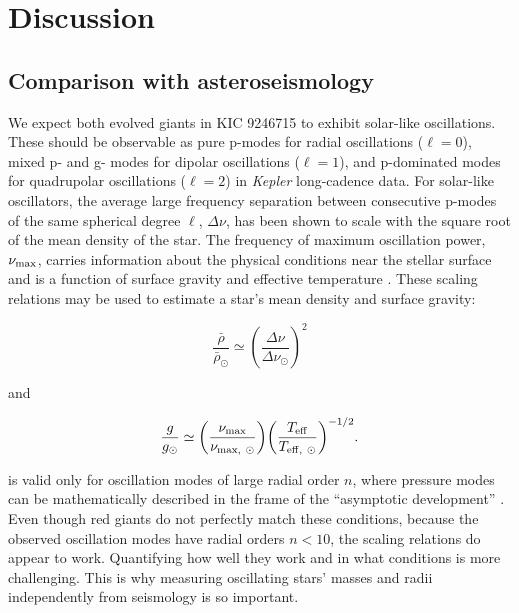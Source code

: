 \section{Discussion}\label{discuss}

\subsection{Comparison with asteroseismology}\label{seismo}
We expect both evolved giants in KIC 9246715 to exhibit solar-like oscillations. These should be observable as pure p-modes for radial oscillations ($\ell = 0$), mixed p- and g- modes for dipolar oscillations ($\ell = 1$), and p-dominated modes for quadrupolar oscillations ($\ell = 2$) in \emph{Kepler} long-cadence data. For solar-like oscillators, the average large frequency separation between consecutive p-modes of the same spherical degree $\ell$, $\Delta \nu$, has been shown to scale with the square root of the mean density of the star. The frequency of maximum oscillation power, $\nu_{\rm{max}}$, carries information about the physical conditions near the stellar surface and is a function of surface gravity and effective temperature \citep{kje95}. These scaling relations may be used to estimate a star's mean density and surface gravity:

\begin{equation} \label{density}
{\frac{\bar{\rho}}{\bar{\rho}_{\odot}}} \simeq {\left( \frac{\Delta \nu}{\Delta \nu_{\odot}} \right)}^{2}
\end{equation}

\noindent and

\begin{equation} \label{gravity}
{\frac{g}{g_{\odot}}} \simeq {\left( \frac{\nu_{\rm{max}}}{\nu_{\rm{max}, \ \odot}} \right)} {\left( \frac{T_{\rm{eff}}}{T_{\rm{eff}, \ \odot}} \right)}^{-1/2}.
\end{equation}

 is valid only for oscillation modes of large radial order $n$, where pressure modes can be mathematically described in the frame of the ``asymptotic development'' \citep{tas80}. Even though red giants do not perfectly match these conditions, because the observed oscillation modes have radial orders $n < 10$, the scaling relations do appear to work. Quantifying how well they work and in what conditions is more challenging. This is why measuring oscillating stars' masses and radii independently from seismology is so important.

